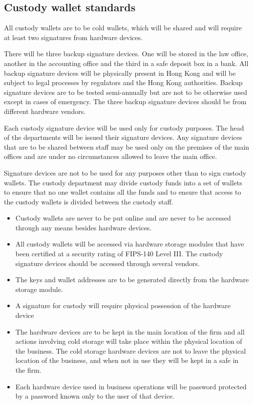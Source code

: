 \subsection{Custody wallet standards}

All custody wallets are to be cold wallets, which will be shared and
will require at least two signatures from hardware devices.

There will be three backup signature devices.  One will be stored in the law office, another in the accounting office and the third in a
safe deposit box in a bank.  All backup signature devices will be
physically present in Hong Kong and will be subject to legal processes
by regulators and the Hong Kong authorities.  Backup signature devices
are to be tested semi-annually but are not to be otherwise used except
in cases of emergency.  The three backup signature devices should be
from different hardware vendors.

Each custody signature device will be used only for custody purposes.
The head of the departments will be issued their signature
devices.  Any signature devices that are to be shared between staff
may be used only on the premises of the main offices and are under no
circumstances allowed to leave the main office.

Signature devices are not to be used for any purposes other than to
sign custody wallets.  The custody department may divide custody funds
into a set of wallets to ensure that no one wallet contains all the
funds and to ensure that access to the custody wallets is divided
between the custody staff.

\begin{itemize}
  \item Custody wallets are never to be put online and are never to be
    accessed through any means besides hardware devices.
  \item All custody wallets will be accessed via hardware storage
    modules that have been certified at a security rating of
    FIPS-140 Level III.  The custody signature devices should be
    accessed through several vendors.
 \item The keys and wallet addresses are to be generated directly from
   the hardware storage module.
 \item A signature for custody will require physical possession
   of the hardware device
 \item The hardware devices are to be kept in the main location of the
   firm and all actions involving cold storage will take place within
   the physical location of the business.  The cold storage hardware
   devices are not to leave the physical location of the business, and
   when not in use they will be kept in a safe in the firm.
 \item Each hardware device used in business operations will be
   password protected by a password known only to the user of that
   device.
\end{itemize}

